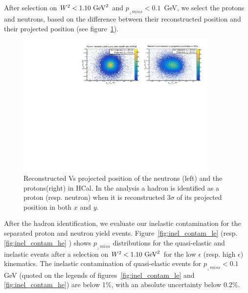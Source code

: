 \documentclass[11pt]{article}
\begin{document}
%

After selection on $W^2 <1.10~{\rm GeV}^2$ and $p_{_{\perp} miss} <0.1$~GeV, we select the protons and neutrons, based on the difference between their reconstructed position and their projected position (see figure~\ref{hcal_id}).
%
\begin{figure}[!h]
  \centering
    \includegraphics[width=10cm]{HCal_PID.pdf}
    \caption{Reconstructed Vs projected position of the neutrons (left) and the protons(right) in HCal. In the analysis a hadron is identified as a proton (resp. neutron) when it is reconstructed 3$\sigma$ of its projected position in both $x$ and $y$.}
    \label{hcal_id}
\end{figure}
%
After the hadron identification, we evaluate our inelastic contamination for the separated proton and neutron yield events.
Figure~\ref{fig:inel_contam_le} (resp. \ref{fig:inel_contam_he} ) shows $p_{_{\perp} miss}$ distributions for the quasi-elastic and inelastic events after a selection on $W^2<1.10~{\rm GeV}^2$ for the low $\epsilon$ (resp. high $\epsilon$) kinematics. The inelastic contamination of quasi-elastic events for $p_{_{\perp} miss} < 0.1$ GeV (quoted on the legends of figures~\ref{fig:inel_contam_le} and \ref{fig:inel_contam_he}) are below 1\%, with an absolute uncertainty below 0.2\%. 
%
\end{document}
